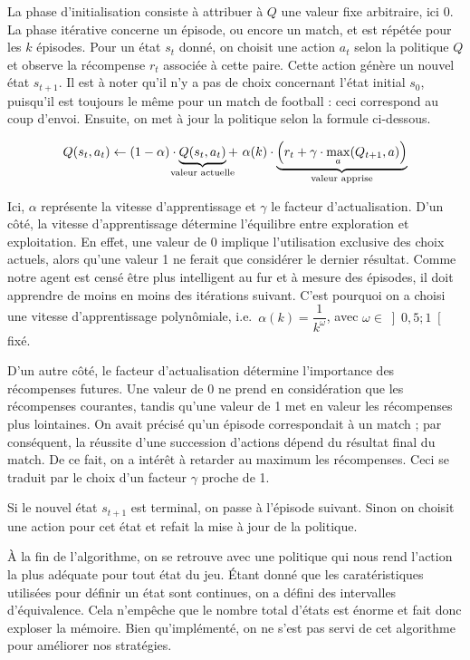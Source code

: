 \documentclass[12pt,a4paper]{article}
\begin{document}
La phase d'initialisation consiste \`a attribuer \`a $Q$ une valeur fixe 
arbitraire, ici 0. La phase it\'erative concerne un \'episode, ou encore un 
match, et est r\'ep\'et\'ee pour les $k$ \'episodes. 
Pour un \'etat $s_t$ donn\'e, on choisit une action $a_t$ selon la politique $Q$ 
et observe la r\'ecompense $r_t$ associ\'ee \`a cette paire. Cette action 
g\'en\`ere un nouvel \'etat $s_{t+1}$. Il est \`a noter qu'il n'y a pas de 
choix concernant l'\'etat initial $s_0$, puisqu'il est toujours le m\^eme pour 
un match de football : ceci correspond au coup d'envoi. Ensuite, on met \`a 
jour la politique selon la formule ci-dessous.

\begin{equation*}
  Q(s_t,a_t) \gets (1-\alpha) \cdot 
  \underbrace{Q(s_t,a_t)}_{\mathclap{\text{valeur actuelle}}} + \ \alpha(k) 
\cdot \underbrace{\Big(r_t + \gamma \cdot \max_a(Q_{t+1},a) 
	\Big)}_{\mathclap{\text{valeur   apprise}}}
\end{equation*}

Ici, $\alpha$ repr\'esente la vitesse d'apprentissage et $\gamma$ le facteur 
d'actualisation. D'un c\^ot\'e, la vitesse d'apprentissage d\'etermine 
l'\'equilibre entre exploration et exploitation. En effet, une valeur de 
0 implique l'utilisation exclusive des choix actuels, alors qu'une 
valeur 1 ne ferait que consid\'erer le dernier r\'esultat.
Comme notre agent est cens\'e \^etre plus intelligent au fur et \`a mesure des 
\'episodes, il doit apprendre de moins en moins des it\'erations suivant. 
C'est pourquoi on a choisi une vitesse d'apprentissage polyn\^omiale, i.e.\ 
$\alpha(k)=\dfrac{1}{k^\omega}$, avec $\omega \in \left] 0,5;1 \right[$ fix\'e.

D'un autre c\^ot\'e, le facteur d'actualisation d\'etermine l'importance des 
r\'ecompenses futures. Une valeur de 0 ne prend en consid\'eration que les 
r\'ecompenses courantes, tandis qu'une valeur de 1 met en valeur les 
r\'ecompenses plus lointaines. On avait pr\'ecis\'e qu'un \'episode 
correspondait \`a un match ; par cons\'equent, la r\'eussite d'une succession 
d'actions d\'epend du r\'esultat final du match. De ce fait, on a int\'er\^et 
\`a retarder au maximum les r\'ecompenses. Ceci se traduit par le choix d'un 
facteur $\gamma$ proche de 1.

Si le nouvel \'etat $s_{t+1}$ est terminal, on passe \`a l'\'episode 
suivant. Sinon on choisit une action pour cet \'etat et refait la mise \`a jour 
de la politique.

\`A la fin de l'algorithme, on se retrouve avec une politique qui nous rend 
l'action la plus ad\'equate pour tout \'etat du jeu. \'Etant donn\'e que les 
carat\'eristiques utilis\'ees pour d\'efinir un \'etat sont continues, 
on a d\'efini des intervalles d'\'equivalence. Cela n'emp\^eche que le nombre 
total d'\'etats est \'enorme et fait donc exploser la m\'emoire. Bien 
qu'impl\'ement\'e, on ne s'est pas servi de cet algorithme pour am\'eliorer nos 
strat\'egies. 
\end{document}
